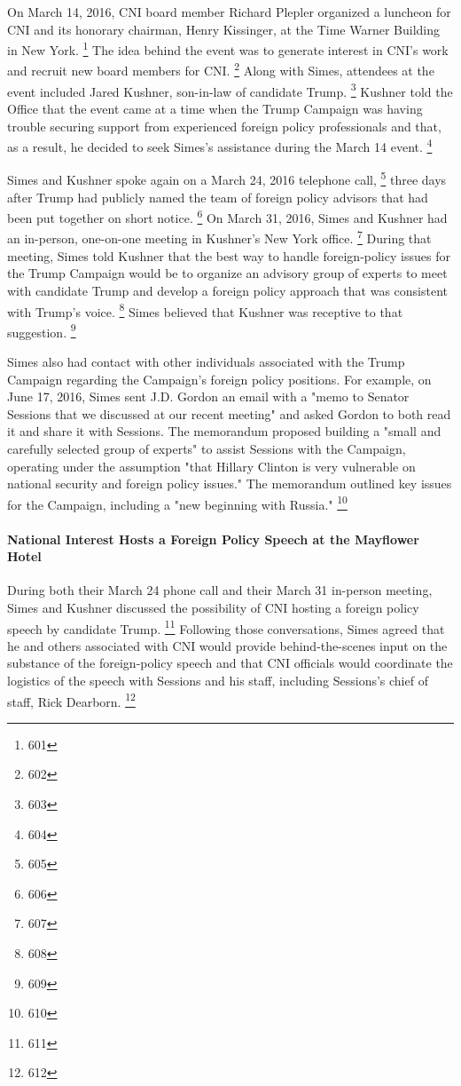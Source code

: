On March 14, 2016, CNI board member Richard Plepler organized a luncheon for CNI and its honorary chairman, Henry Kissinger, at the Time Warner Building in New York.%
\footnote{601}
The idea behind the event was to generate interest in CNI's work and recruit new board members for CNI.%
\footnote{602}
Along with Simes, attendees at the event included Jared Kushner, son-in-law of candidate Trump.%
\footnote{603}
Kushner told the Office that the event came at a time when the Trump Campaign was having trouble securing support from experienced foreign policy professionals and that, as a result, he decided to seek Simes's assistance during the March 14 event.%
\footnote{604}

Simes and Kushner spoke again on a March 24, 2016 telephone call,%
\footnote{605}
three days after Trump had publicly named the team of foreign policy advisors that had been put together on short notice.%
\footnote{606}
On March 31, 2016, Simes and Kushner had an in-person, one-on-one meeting in Kushner's New York office.%
\footnote{607}
During that meeting, Simes told Kushner that the best way to handle foreign-policy issues for the Trump Campaign would be to organize an advisory group of experts to meet with candidate Trump and develop a foreign policy approach that was consistent with Trump's voice.%
\footnote{608}
Simes believed that Kushner was receptive to that suggestion.%
\footnote{609}

Simes also had contact with other individuals associated with the Trump Campaign regarding the Campaign's foreign policy positions.
For example, on June 17, 2016, Simes sent J.D. Gordon an email with a "memo to Senator Sessions that we discussed at our recent meeting" and asked Gordon to both read it and share it with Sessions.
The memorandum proposed building a "small and carefully selected group of experts" to assist Sessions with the Campaign, operating under the assumption "that Hillary Clinton is very vulnerable on national security and foreign policy issues."
The memorandum outlined key issues for the Campaign, including a "new beginning with Russia."%
\footnote{610}

\paragraph{National Interest Hosts a Foreign Policy Speech at the Mayflower Hotel}

During both their March 24 phone call and their March 31 in-person meeting, Simes and Kushner discussed the possibility of CNI hosting a foreign policy speech by candidate Trump.%
\footnote{611}
Following those conversations, Simes agreed that he and others associated with CNI would provide behind-the-scenes input on the substance of the foreign-policy speech and that CNI officials would coordinate the logistics of the speech with Sessions and his staff, including Sessions's chief of staff, Rick Dearborn.%
\footnote{612}


